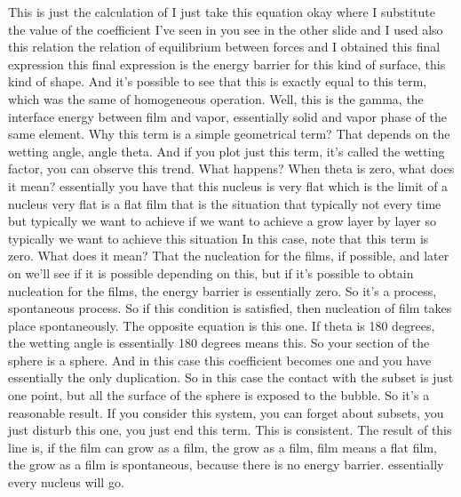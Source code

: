 This is just the calculation of I just take this equation okay where I substitute the value of the coefficient I've seen in you see in the other slide and I used also this relation the relation of equilibrium between forces and I obtained this final expression this final expression is the energy barrier for this kind of surface, this kind of shape. And it's possible to see that this is exactly equal to this term, which was the same of homogeneous operation. Well, this is the gamma, the interface energy between film and vapor, essentially solid and vapor phase of the same element. Why this term is a simple geometrical term? That depends on the wetting angle, angle theta. And if you plot just this term, it's called the wetting factor, you can observe this trend. What happens? When theta is zero, what does it mean? essentially you have that this nucleus is very flat which is the limit of a nucleus very flat is a flat film that is the situation that typically not every time but typically we want to achieve if we want to achieve a grow layer by layer so typically we want to achieve this situation In this case, note that this term is zero. What does it mean? That the nucleation for the films, if possible, and later on we'll see if it is possible depending on this, but if it's possible to obtain nucleation for the films, the energy barrier is essentially zero. So it's a process, spontaneous process. So if this condition is satisfied, then nucleation of film takes place spontaneously. The opposite equation is this one. If theta is 180 degrees, the wetting angle is essentially 180 degrees means this. So your section of the sphere is a sphere. And in this case this coefficient becomes one and you have essentially the only duplication. So in this case the contact with the subset is just one point, but all the surface of the sphere is exposed to the bubble. So it's a reasonable result. If you consider this system, you can forget about subsets, you just disturb this one, you just end this term. This is consistent. The result of this line is, if the film can grow as a film, the grow as a film, film means a flat film, the grow as a film is spontaneous, because there is no energy barrier. essentially every nucleus will go.
